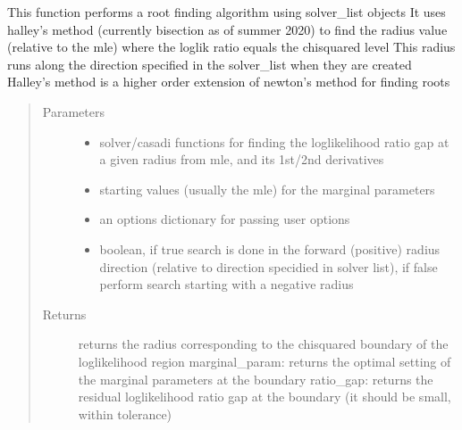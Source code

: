 \documentclass[letterpaper,10pt,english,openany,oneside]{sphinxmanual}
\begin{document}
\begin{fulllineitems}
\begin{fulllineitems}
\label{\detokenize{nloed:nloed.model.Model.__logliksearch}}
This function performs a root finding algorithm using solver\_list objects
It uses halley’s method (currently bisection as of summer 2020) to find the radius value (relative to the mle) where the loglik ratio equals the chi\sphinxhyphen{}squared level
This radius runs along the direction specified in the solver\_list when they are created
Halley’s method is a higher order extension of newton’s method for finding roots
\begin{quote}\begin{description}
\item[{Parameters}] \leavevmode\begin{itemize}
\item {} 
 \textendash{} solver/casadi functions for finding the loglikelihood ratio gap at a given radius from mle,  and its 1st/2nd derivatives

\item {} 
 \textendash{} starting values (usually the mle) for the marginal parameters

\item {} 
 \textendash{} an options dictionary for passing user options

\item {} 
 \textendash{} boolean,  if true search is done in the forward (positive) radius direction (relative to direction specidied in solver list),  if false perform search starting with a negative radius

\end{itemize}

\item[{Returns}] \leavevmode
returns the radius corresponding to the chi\sphinxhyphen{}squared boundary of the loglikelihood region
marginal\_param: returns the optimal setting of the marginal parameters at the boundary
ratio\_gap: returns the residual loglikelihood ratio gap at the boundary (it should be small,  within tolerance)


\end{description}
\end{quote}
\end{fulllineitems}
\end{fulllineitems}
\end{document}
